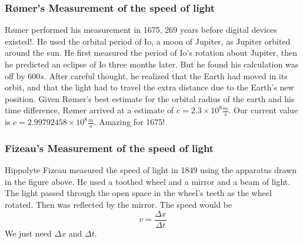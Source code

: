\documentclass{article}
\begin{document}
\subsubsection{R\o mer's Measurement of the speed of light}

R\o mer performed his measurement
in 1675, 269 years before digital devices existed!. He used the orbital
period of Io, a moon of Jupiter, as Jupiter orbited around the sun. He first
measured the period of Io's rotation about Jupiter, then he predicted an
eclipse of Io three months later. But he found his calculation was off by $%
600\unit{s}.$ After careful thought, he realized that the Earth had moved in
its orbit, and that the light had to travel the extra distance due to the
Earth's new position. Given R\o mer's best estimate for the orbital radius
of the earth and his time difference, R\o mer arrived at a estimate of $%
c=2.3\times 10^{8}\frac{\unit{m}}{\unit{s}}.$ Our current value is $%
c=2.99792458\times 10^{8}\frac{\unit{m}}{\unit{s}}.$ Amazing for 1675!

\subsubsection{Fizeau's Measurement of the speed of light}

Hippolyte Fizeau measured the
speed of light in 1849 using the apparatus drawn in the figure above. He
used a toothed wheel and a mirror and a beam of light. The light passed
through the open space in the wheel's teeth as the wheel rotated. Then was
reflected by the mirror. The speed would be%
\[
v=\frac{\Delta x}{\Delta t}
\]%
We just need $\Delta x$ and $\Delta t.$
\end{document}
